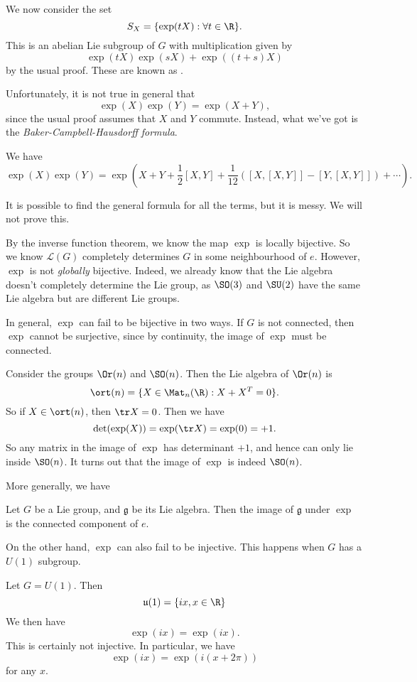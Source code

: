 \documentclass[a4paper]{article}
\begin{document}
We now consider the set
\[
  S_{X} = \{\exp(tX): \forall t \in \R\}.
\]
This is an abelian Lie subgroup of $G$ with multiplication given by
\[
  \exp(tX) \exp(sX) + \exp((t + s)X)
\]
by the usual proof. These are known as .

Unfortunately, it is not true in general that
\[
  \exp(X) \exp(Y) = \exp(X + Y),
\]
since the usual proof assumes that $X$ and $Y$ commute. Instead, what we've got is the \emph{Baker-Campbell-Hausdorff formula}.
\begin{thm}
  We have
  \[
    \exp(X) \exp(Y) = \exp\left(X + Y + \frac{1}{2}[X, Y] + \frac{1}{12}([X, [X, Y]] - [Y, [X, Y]]) + \cdots\right).
  \]
\end{thm}
It is possible to find the general formula for all the terms, but it is messy. We will not prove this.

By the inverse function theorem, we know the map $\exp$ is locally bijective. So we know $\mathcal{L}(G)$ completely determines $G$ in some neighbourhood of $e$. However, $\exp$ is not \emph{globally} bijective. Indeed, we already know that the Lie algebra doesn't completely determine the Lie group, as $\SO(3)$ and $\SU(2)$ have the same Lie algebra but are different Lie groups.

In general, $\exp$ can fail to be bijective in two ways. If $G$ is not connected, then $\exp$ cannot be surjective, since by continuity, the image of $\exp$ must be connected.

\begin{eg}
  Consider the groups $\Or(n)$ and $\SO(n)$. Then the Lie algebra of $\Or(n)$ is
  \[
    \ort(n) = \{X \in \Mat_n(\R): X + X^T = 0\}.
  \]
  So if $X \in \ort(n)$, then $\tr X = 0$. Then we have
  \[
    \det (\exp(X)) = \exp(\tr X) = \exp(0) = +1.
  \]
  So any matrix in the image of $\exp$ has determinant $+1$, and hence can only lie inside $\SO(n)$. It turns out that the image of $\exp$ is indeed $\SO(n)$.
\end{eg}

More generally, we have
\begin{prop}
  Let $G$ be a Lie group, and $\mathfrak{g}$ be its Lie algebra. Then the image of $\mathfrak{g}$ under $\exp$ is the connected component of $e$.
\end{prop}

On the other hand, $\exp$ can also fail to be injective. This happens when $G$ has a $U(1)$ subgroup.
\begin{eg}
  Let $G = U(1)$. Then
  \[
    \mathfrak{u}(1) = \{ix, x \in \R\}
  \]
  We then have
  \[
    \exp(ix) = \exp(ix).
  \]
  This is certainly not injective. In particular, we have
  \[
    \exp(ix) = \exp(i(x + 2\pi))
  \]
  for any $x$.
\end{eg}
\end{document}
